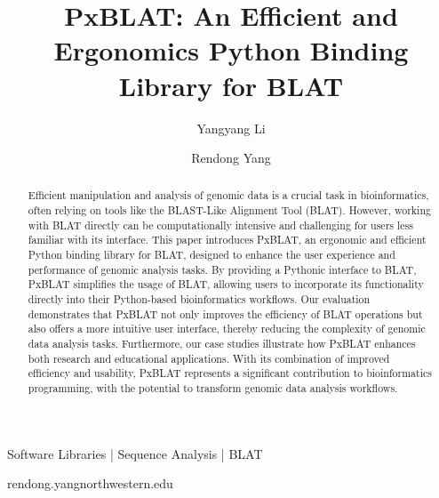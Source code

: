 
\title{PxBLAT: An Efficient and Ergonomics Python Binding Library for BLAT}

\author[1]{Yangyang Li}
\author[1,\Letter]{Rendong Yang }
\date{}

\maketitle

\begin{abstract}
	Efficient manipulation and analysis of genomic data is a crucial task in bioinformatics, often relying on tools like the BLAST-Like Alignment Tool (BLAT).
	However, working with BLAT directly can be computationally intensive and challenging for users less familiar with its interface.
	This paper introduces PxBLAT, an ergonomic and efficient Python binding library for BLAT, designed to enhance the user experience and performance of genomic analysis tasks.
	By providing a Pythonic interface to BLAT, PxBLAT simplifies the usage of BLAT, allowing users to incorporate its functionality directly into their Python-based bioinformatics workflows.
	Our evaluation demonstrates that PxBLAT not only improves the efficiency of BLAT operations but also offers a more intuitive user interface, thereby reducing the complexity of genomic data analysis tasks.
	Furthermore, our case studies illustrate how PxBLAT enhances both research and educational applications.
	With its combination of improved efficiency and usability, PxBLAT represents a significant contribution to bioinformatics programming, with the potential to transform genomic data analysis workflows.
\end{abstract}


\begin{keywords}
	Software Libraries |  Sequence Analysis | BLAT
\end{keywords}

\begin{corrauthor}
	rendong.yang\at northwestern.edu
\end{corrauthor}


